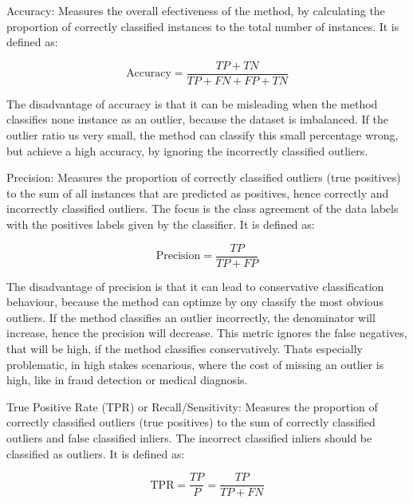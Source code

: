 \enumerate

    \item Accuracy: Measures the overall efectiveness of the method, by calculating the proportion of correctly classified instances to the total number of instances.
    It is defined as:
    
    \begin{equation}
        \text{Accuracy} = \frac{TP + TN}{TP + FN + FP + TN}
    \end{equation}

    The disadvantage of accuracy is that it can be misleading when the method classifies none instance as an outlier, because the dataset is imbalanced.
    If the outlier ratio us very small, the method can classify this small percentage wrong, but achieve a high accuracy, by ignoring the incorrectly classified outliers.

    \item Precision: Measures the proportion of correctly classified outliers (true positives) to the sum of all instances that are predicted as positives, hence correctly and incorrectly classified outliers.
    The focus is the class agreement of the data labels with the positives labels given by the classifier.
    It is defined as: 

    \begin{equation}
        \text{Precision} = \frac{TP}{TP + FP}
    \end{equation}

    The disadvantage of precision is that it can lead to conservative classification behaviour, because the method can optimze by ony classify the most obvious outliers.
    If the method classifies an outlier incorrectly, the denominator will increase, hence the precision will decrease. 
    This metric ignores the false negatives, that will be high, if the method classifies conservatively.
    Thats especially problematic, in high stakes scenarious, where the cost of missing an outlier is high, like in fraud detection or medical diagnosis.

    \item True Positive Rate (TPR) or Recall/Sensitivity: Measures the proportion of correctly classified outliers (true positives) to the sum of correctly classified outliers and false classified inliers.
    The incorrect classified inliers should be classified as outliers.
    It is defined as: 

    \begin{equation}
        \text{TPR} = \frac{TP}{P} = \frac{TP}{TP + FN}
    \end{equation}

